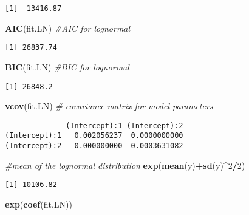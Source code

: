 \documentclass[]{book}
\newenvironment{Shaded}{\begin{snugshade}}{\end{snugshade}}
\newcommand{\KeywordTok}[1]{\textcolor[rgb]{0.13,0.29,0.53}{\textbf{#1}}}
\newcommand{\DecValTok}[1]{\textcolor[rgb]{0.00,0.00,0.81}{#1}}
\newcommand{\CommentTok}[1]{\textcolor[rgb]{0.56,0.35,0.01}{\textit{#1}}}
\newcommand{\OperatorTok}[1]{\textcolor[rgb]{0.81,0.36,0.00}{\textbf{#1}}}
\newcommand{\NormalTok}[1]{#1}
\theoremstyle{definition}
\theoremstyle{definition}
\theoremstyle{definition}
\theoremstyle{remark}
\begin{document}
\begin{verbatim}
[1] -13416.87
\end{verbatim}

\begin{Shaded}
\begin{Highlighting}[]
\KeywordTok{AIC}\NormalTok{(fit.LN)                  }\CommentTok{#AIC for lognormal}
\end{Highlighting}
\end{Shaded}

\begin{verbatim}
[1] 26837.74
\end{verbatim}

\begin{Shaded}
\begin{Highlighting}[]
\KeywordTok{BIC}\NormalTok{(fit.LN)                  }\CommentTok{#BIC for lognormal}
\end{Highlighting}
\end{Shaded}

\begin{verbatim}
[1] 26848.2
\end{verbatim}

\begin{Shaded}
\begin{Highlighting}[]
\KeywordTok{vcov}\NormalTok{(fit.LN)                 }\CommentTok{# covariance matrix for model parameters }
\end{Highlighting}
\end{Shaded}

\begin{verbatim}
              (Intercept):1 (Intercept):2
(Intercept):1   0.002056237  0.0000000000
(Intercept):2   0.000000000  0.0003631082
\end{verbatim}

\begin{Shaded}
\begin{Highlighting}[]
\CommentTok{#mean of the lognormal distribution}
\KeywordTok{exp}\NormalTok{(}\KeywordTok{mean}\NormalTok{(y)}\OperatorTok{+}\KeywordTok{sd}\NormalTok{(y)}\OperatorTok{^}\DecValTok{2}\OperatorTok{/}\DecValTok{2}\NormalTok{)}
\end{Highlighting}
\end{Shaded}

\begin{verbatim}
[1] 10106.82
\end{verbatim}

\begin{Shaded}
\begin{Highlighting}[]
\KeywordTok{exp}\NormalTok{(}\KeywordTok{coef}\NormalTok{(fit.LN))}
\end{Highlighting}
\end{Shaded}
\end{document}
